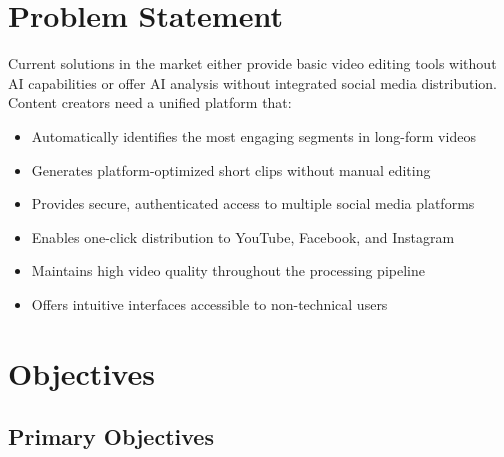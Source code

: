 \section{Problem Statement}

Current solutions in the market either provide basic video editing tools without AI capabilities or offer AI analysis without integrated social media distribution. Content creators need a unified platform that:

\begin{itemize}
    \item Automatically identifies the most engaging segments in long-form videos
    \item Generates platform-optimized short clips without manual editing
    \item Provides secure, authenticated access to multiple social media platforms
    \item Enables one-click distribution to YouTube, Facebook, and Instagram
    \item Maintains high video quality throughout the processing pipeline
    \item Offers intuitive interfaces accessible to non-technical users
\end{itemize}

\section{Objectives}

\subsection{Primary Objectives}

